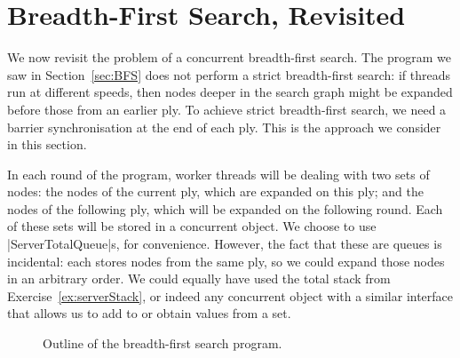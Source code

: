 \section{Breadth-First Search, Revisited}
\label{sec:sync-BFS}

We now revisit the problem of a concurrent breadth-first search.  The program
we saw in Section~\ref{sec:BFS} does not perform a strict breadth-first
search: if threads run at different speeds, then nodes deeper in the search
graph might be expanded before those from an earlier ply.  To achieve strict
breadth-first search, we need a barrier synchronisation at the end of each
ply.  This is the approach we consider in this section.

In each round of the program, worker threads will be dealing with two sets of
nodes: the nodes of the current ply, which are expanded on this ply; and the
nodes of the following ply, which will be expanded on the following round.
Each of these sets will be stored in a concurrent object.  We choose to use
|ServerTotalQueue|s, for convenience.  However, the fact that these are queues
is incidental: each stores nodes from the same ply, so we could expand those
nodes in an arbitrary order.  We could equally have used the total stack from
Exercise~\ref{ex:serverStack}, or indeed any concurrent object with a similar
interface that allows us to add to or obtain values from a set.


\begin{figure}
\caption{Outline of the breadth-first search program.}
\label{fig:sync-BFS}
\end{figure}

